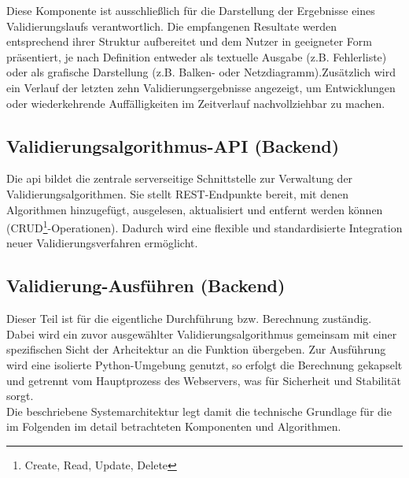Diese Komponente ist ausschließlich für die Darstellung der Ergebnisse eines Validierungslaufs verantwortlich. Die empfangenen Resultate werden entsprechend ihrer Struktur aufbereitet und dem Nutzer in geeigneter Form präsentiert, je nach Definition entweder als textuelle Ausgabe (z.B. Fehlerliste) oder als grafische Darstellung (z.B. Balken- oder Netzdiagramm).Zusätzlich wird ein Verlauf der letzten zehn Validierungsergebnisse angezeigt, um Entwicklungen oder wiederkehrende Auffälligkeiten im Zeitverlauf nachvollziehbar zu machen.

\subsection*{Validierungsalgorithmus-API (Backend)}

Die \gls{api} bildet die zentrale serverseitige Schnittstelle zur Verwaltung der Validierungsalgorithmen. Sie stellt REST-Endpunkte bereit, mit denen Algorithmen hinzugefügt, ausgelesen, aktualisiert und entfernt werden können (CRUD\footnote{Create, Read, Update, Delete}-Operationen). Dadurch wird eine flexible und standardisierte Integration neuer Validierungsverfahren ermöglicht.

\subsection*{Validierung-Ausführen (Backend)}

Dieser Teil ist für die eigentliche Durchführung bzw. Berechnung zuständig. Dabei wird ein zuvor ausgewählter Validierungsalgorithmus gemeinsam mit einer spezifischen Sicht der Arhcitektur an die Funktion übergeben. Zur Ausführung wird eine isolierte Python-Umgebung genutzt, so erfolgt die Berechnung gekapselt und getrennt vom Hauptprozess des Webservers, was für Sicherheit und Stabilität sorgt.\\


Die beschriebene Systemarchitektur legt damit die technische Grundlage für die im Folgenden im detail betrachteten Komponenten und Algorithmen.




